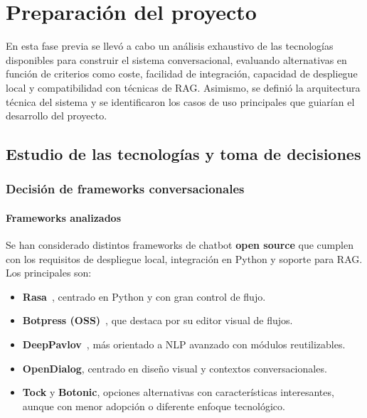 \chapter{Preparación del proyecto}
\label{cap:preparacion}

En esta fase previa se llevó a cabo un análisis exhaustivo de las tecnologías disponibles para construir el sistema conversacional, evaluando alternativas en función de criterios como coste, facilidad de integración, capacidad de despliegue local y compatibilidad con técnicas de RAG. Asimismo, se definió la arquitectura técnica del sistema y se identificaron los casos de uso principales que guiarían el desarrollo del proyecto.

\section{Estudio de las tecnologías y toma de decisiones}
\label{sec:estudio-tecnologias}

\subsection{Decisión de frameworks conversacionales}

\subsubsection{Frameworks analizados}

Se han considerado distintos frameworks de chatbot \textbf{open source} que cumplen con los requisitos de despliegue local, integración en Python y soporte para RAG. Los principales son:

\begin{itemize}
    \item \textbf{Rasa}~\cite{bocklisch2017rasa}, centrado en Python y con gran control de flujo.
    \item \textbf{Botpress (OSS)}~\cite{botpressdocs}, que destaca por su editor visual de flujos.
    \item \textbf{DeepPavlov}~\cite{deeppavlov}, más orientado a NLP avanzado con módulos reutilizables.
    \item \textbf{OpenDialog}, centrado en diseño visual y contextos conversacionales.
    \item \textbf{Tock} y \textbf{Botonic}, opciones alternativas con características interesantes, aunque con menor adopción o diferente enfoque tecnológico.
\end{itemize}

